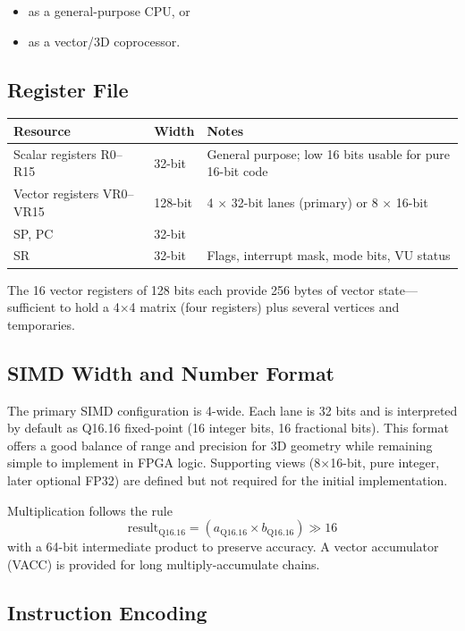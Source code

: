\documentclass[11pt,a4paper]{article}
\begin{document}
\begin{itemize}
    \item as a general-purpose CPU, or
    \item as a vector/3D coprocessor.
\end{itemize}

\subsection{Register File}

\begin{center}
\begin{tabular}{@{}llp{6cm}@{}}
\toprule
Resource & Width & Notes \\
\midrule
Scalar registers R0--R15 & 32-bit & General purpose; low 16 bits usable for pure 16-bit code \\
Vector registers VR0--VR15 & 128-bit & 4 $\times$ 32-bit lanes (primary) or 8 $\times$ 16-bit \\
SP, PC & 32-bit & \\
SR & 32-bit & Flags, interrupt mask, mode bits, VU status \\
\bottomrule
\end{tabular}
\end{center}

The 16 vector registers of 128 bits each provide 256 bytes of vector state---sufficient to hold a 4$\times$4 matrix (four registers) plus several vertices and temporaries.

\subsection{SIMD Width and Number Format}

The primary SIMD configuration is 4-wide. Each lane is 32 bits and is interpreted by default as Q16.16 fixed-point (16 integer bits, 16 fractional bits). This format offers a good balance of range and precision for 3D geometry while remaining simple to implement in FPGA logic. Supporting views (8$\times$16-bit, pure integer, later optional FP32) are defined but not required for the initial implementation.

Multiplication follows the rule
\[
\text{result}_{\text{Q16.16}} = (a_{\text{Q16.16}} \times b_{\text{Q16.16}}) \gg 16
\]
with a 64-bit intermediate product to preserve accuracy. A vector accumulator (VACC) is provided for long multiply-accumulate chains.

\subsection{Instruction Encoding}
\end{document}
